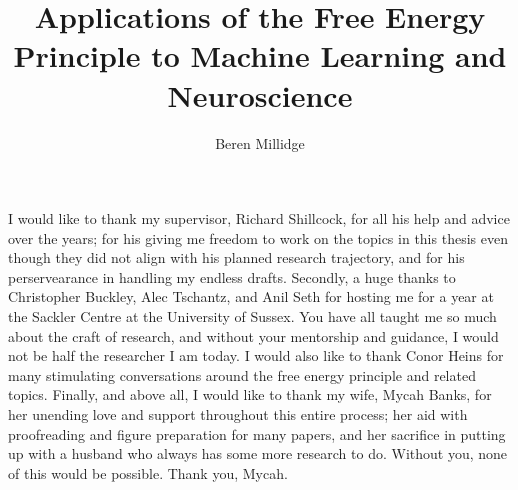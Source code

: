 \documentclass[phd,anc,oneside,logo,doublespacing,sansheadings,romanprepages,parskip]{infthesis}
\title{Applications of the Free Energy Principle to Machine Learning and Neuroscience}
\author{Beren Millidge}
\begin{document}
\begin{preliminary}

\maketitle

\begin{acknowledgements}
I would like to thank my supervisor, Richard Shillcock, for all his help and advice over the years; for his giving me freedom to work on the topics in this thesis even though they did not align with his planned research trajectory, and for his perservearance in handling my endless drafts. Secondly, a huge thanks to Christopher Buckley, Alec Tschantz, and Anil Seth for hosting me for a year at the Sackler Centre at the University of Sussex.  You have all taught me so much about the craft of research, and without your mentorship and guidance, I would not be half the researcher I am today. I would also like to thank Conor Heins for many stimulating conversations around the free energy principle and related topics.  Finally, and above all, I would like to thank my wife, Mycah Banks, for her unending love and support throughout this entire process; her aid with proofreading and figure preparation for many papers, and her sacrifice in putting up with a husband who always has some more research to do. Without you, none of this would be possible. Thank you, Mycah.
\end{acknowledgements}

\standarddeclaration


\tableofcontents

 \listoffigures

\end{preliminary}










\appendix







\end{document}

